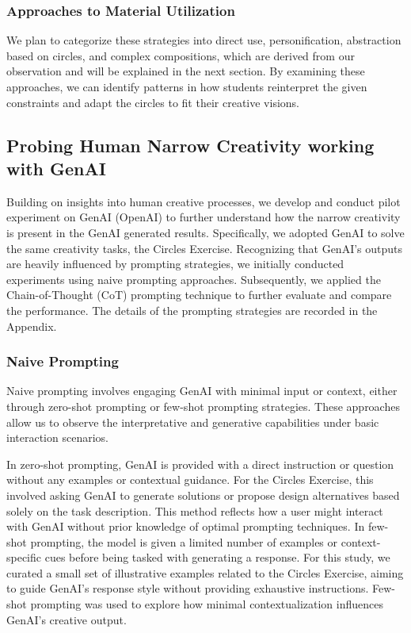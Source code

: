 \subsubsection{Approaches to Material Utilization}
 We plan to categorize these strategies into direct use, personification, abstraction based on circles, and complex compositions, which are derived from our observation and will be explained in the next section. By examining these approaches, we can identify patterns in how students reinterpret the given constraints and adapt the circles to fit their creative visions. 

\subsection{Probing Human Narrow Creativity working with GenAI}

Building on insights into human creative processes, we develop and conduct pilot experiment on GenAI (OpenAI) to further understand how the narrow creativity is present in the GenAI generated results. Specifically, we adopted GenAI to solve the same creativity tasks, the Circles Exercise. 
Recognizing that GenAI’s outputs are heavily influenced by prompting strategies, we initially conducted experiments using naive prompting approaches. Subsequently, we applied the Chain-of-Thought (CoT) prompting technique to further evaluate and compare the performance. The details of the prompting strategies are recorded in the Appendix.

\subsubsection{Naive Prompting}

Naive prompting involves engaging GenAI with minimal input or context, either through zero-shot prompting or few-shot prompting strategies. These approaches allow us to observe the interpretative and generative capabilities under basic interaction scenarios.

In zero-shot prompting, GenAI is provided with a direct instruction or question without any examples or contextual guidance. For the Circles Exercise, this involved asking GenAI to generate solutions or propose design alternatives based solely on the task description. This method reflects how a user might interact with GenAI without prior knowledge of optimal prompting techniques.
In few-shot prompting, the model is given a limited number of examples or context-specific cues before being tasked with generating a response. For this study, we curated a small set of illustrative examples related to the Circles Exercise, aiming to guide GenAI’s response style without providing exhaustive instructions. Few-shot prompting was used to explore how minimal contextualization influences GenAI’s creative output.

